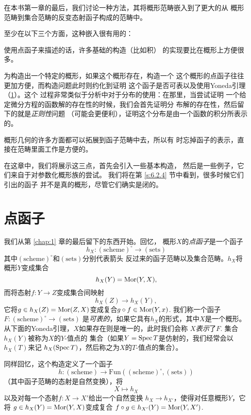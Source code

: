 在本书第一章的最后，我们讨论一种方法，其将概形范畴嵌入到了更大的从
概形范畴到集合范畴的反变态射函子构成的范畴中。

至少在以下三个方面，这种嵌入很有用的：

\begin{compactenum}[(1)]
\item 使用点函子来描述的话，许多基础的构造（比如积）
的实现要比在概形上方便很多。
\item 为构造出一个特定的概形，如果这个概形存在，构造一个
这个概形的点函子往往更加方便，而构造问题此时则约化到证明
这个函子是否可表以及使用Yoneda引理（\ref{s:6.1}）。这个
过程非常类似于分析中对于分布的使用：在那里，当尝试证明
一个给定微分方程的函数解的存在性的时候，我们会首先证明分
布解的存在性，然后留下的就是\textit{正则性}问题
（可能会更便利），证明这个分布是由一个函数的积分所表示的。
\item 概形几何的许多方面都可以拓展到函子范畴中去，所以有
时忘掉函子的表示，直接在范畴里面工作是方便的。
\end{compactenum}

在这章中，我们将展示这三点，首先会引入一些基本构造，
然后是一些例子，它们来自于对参数化概形族的尝试。
我们将在第 \ref{s:6.2.4} 节中看到，很多时候它们引出的函子
并不是真的概形，尽管它们确实是闭的。


\section{点函子}\label{s:6.1}

我们从第 \ref{chap:1} 章的最后留下的东西开始。回忆，
概形$X$的\textit{点函子}是一个函子
\[
	h_X:(\text{scheme})^\circ \to (\text{sets})
\]
其中$(\text{scheme})^\circ$和$(\text{sets})$分别代表箭头
反过来的函子范畴以及集合范畴。$h_X$将概形$Y$变成集合
\[
	h_X(Y)=\operatorname{Mor}(Y,X),
\]
而将态射$f:Y\to Z$变成集合间映射
\[
	h_X(Z)\to h_X(Y),
\]
它将$g\in h_X(Z)=\operatorname{Mor}(Z,X)$变成复合$g\circ f\in \operatorname{Mor}(Y,x)$.
我们称一个函子$F:(\text{scheme})^\circ \to (\text{sets})$
是\textit{可表的}，如果它具有$h_X$的形式，其中$X$是一个概形。
从下面的Yoneda引理，$X$如果存在则是唯一的，此时我们会称
$X$\textit{表示}了$F$. 集合$h_X(Y)$被称为$X$的$Y$-值点的
集合（如果$Y=\operatorname{Spec} T$是仿射的，我们经常会以$h_X(T)$来记
$h_X(\operatorname{Spec} T)$，然后称之为$X$的$T$-值点的集合）。

同样回忆，这个构造定义了一个函子
\[
	h:(\text{scheme})\to \mathrm{Fun}
	((\text{scheme})^\circ ,(\text{sets}))
\]
（其中函子范畴的态射是自然变换），将
\[
	X\mapsto h_X
\]
以及对每一个态射$f:X\to X'$给出一个自然变换
$h_X\to h_{X'}$，使得对任意概形$Y$，它将
$g\in h_X(Y)=\operatorname{Mor}(Y,X)$变成复合
$f\circ g\in h_{X'}(Y)=\operatorname{Mor}(Y,X')$.

